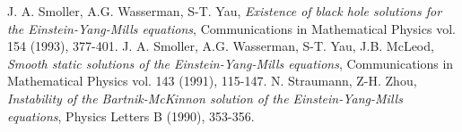 \documentclass{article}[11pt]
\numberwithin{equation}{section}
\begin{document}
\begin{thebibliography}{}
 J. A. Smoller, A.G. Wasserman, S-T. Yau, \textit{Existence of black hole solutions for the Einstein-Yang-Mills equations}, Communications in Mathematical Physics  vol. 154 (1993), 377-401.
 J. A. Smoller, A.G. Wasserman, S-T. Yau, J.B. McLeod, \textit{Smooth static solutions of the Einstein-Yang-Mills equations}, Communications in Mathematical Physics vol. 143 (1991), 115-147.
 N. Straumann, Z-H. Zhou, \textit{Instability of the Bartnik-McKinnon solution of the Einstein-Yang-Mills equations}, Physics Letters B (1990), 353-356.


 










\end{thebibliography}
\end{document}
